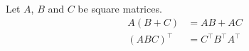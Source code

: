 \documentclass{article}
\begin{document}
Let $A$, $B$ and $C$ be square matrices.
\begin{align*}
A (B + C) &= A B + A C \\
(A B C)^\top &= C^\top
  B^\top A^\top
\end{align*}
\end{document}

